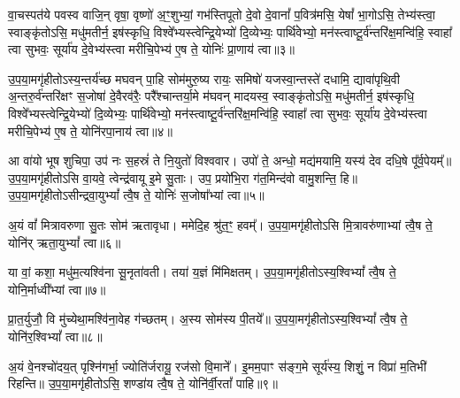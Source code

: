 {\anuvakamend[{यु॒ष्माकꣴ॑ स्वर॒ यत्ते॒ नव॑ च॥१॥}]}

वा॒चस्पत॑ये पवस्व वाजि॒न् वृषा॒ वृष्णो॑ अ॒ꣳ॒शुभ्यां॒ गभ॑स्तिपूतो दे॒वो दे॒वानां᳚ प॒वित्र॑मसि॒ येषां᳚ भा॒गो\-ऽसि॒ तेभ्य॑स्त्वा॒ स्वाङ्कृ॑तो\-ऽसि॒ मधु॑मतीर्न॒ इष॑स्कृधि॒ विश्वे᳚भ्यस्त्वेन्द्रि॒येभ्यो॑ दि॒व्येभ्यः॒ पार्थि॑वेभ्यो॒ मन॑स्त्वाष्टू॒र्व॑न्तरि॑क्ष॒मन्वि॑हि॒ स्वाहा᳚ त्वा सुभवः॒ सूर्या॑य दे॒वेभ्य॑स्त्वा मरीचि॒पेभ्य॑ ए॒ष ते॒ योनिः॑ प्रा॒णाय॑ त्वा॥३॥

{\anuvakamend[{वा॒चः स॒प्तच॑त्वारिꣳशत्॥२॥}]}

उ॒प॒या॒मगृ॑हीतो\-ऽस्य॒न्तर्य॑च्छ मघवन् पा॒हि सोम॑मुरु॒ष्य रायः॒ समिषो॑ यजस्वा॒न्तस्ते॑ दधामि॒ द्यावा॑पृथि॒वी अ॒न्तरु॒र्व॑न्तरि॑क्षꣳ स॒जोषा॑ दे॒वैरव॑रैः॒ परै᳚श्चान्तर्या॒मे म॑घवन् मादयस्व॒ स्वाङ्कृ॑तो\-ऽसि॒ मधु॑मतीर्न॒ इष॑स्कृधि॒ विश्वे᳚भ्यस्त्वेन्द्रि॒येभ्यो॑ दि॒व्येभ्यः॒ पार्थि॑वेभ्यो॒ मन॑स्त्वाष्टू॒र्व॑न्तरि॑क्ष॒मन्वि॑हि॒ स्वाहा᳚ त्वा सुभवः॒ सूर्या॑य दे॒वेभ्य॑स्त्वा मरीचि॒पेभ्य॑ ए॒ष ते॒ योनि॑रपा॒नाय॑ त्वा॥४॥

{\anuvakamend[{दे॒वेभ्यः॑ स॒प्त च॑॥३॥}]}

आ वा॑यो भूष शुचिपा॒ उप॑ नः स॒हस्रं॑ ते नि॒युतो॑ विश्ववार। उपो॑ ते॒ अन्धो॒ मद्य॑मयामि॒ यस्य॑ देव दधि॒षे पू᳚र्व॒पेयम्᳚॥ उ॒प॒या॒मगृ॑हीतो\-ऽसि वा॒यवे॒ त्वेन्द्र॑वायू इ॒मे सु॒ताः। उप॒ प्रयो॑भि॒रा ग॑त॒मिन्द॑वो वामु॒शन्ति॒ हि॥ उ॒प॒या॒मगृ॑हीतो\-ऽसीन्द्रवा॒यु\-भ्यां᳚ त्वै॒ष ते॒ योनिः॑ स॒जोषा᳚भ्यां त्वा॥५॥

{\anuvakamend[{आ वा॑यो॒ त्रिच॑त्वारिꣳशत्॥४॥}]}

अ॒यं वां᳚ मित्रावरुणा सु॒तः सोम॑ ऋतावृधा। ममेदि॒ह श्रु॑त॒ꣳ॒ हवम्᳚। उ॒प॒या॒मगृ॑हीतो\-ऽसि मि॒त्रावरु॑णाभ्यां त्वै॒ष ते॒ योनि॑र् ऋता॒यु\-भ्यां᳚ त्वा॥६॥

{\anuvakamend[{अ॒यं वां᳚ विꣳश॒तिः॥५॥}]}

या वां॒ कशा॒ मधु॑म॒त्यश्वि॑ना सू॒नृता॑वती। तया॑ य॒ज्ञं मि॑मिक्षतम्। उ॒प॒या॒मगृ॑हीतो\-ऽस्य॒श्वि\-भ्यां᳚ त्वै॒ष ते॒ योनि॒र्माध्वी᳚भ्यां त्वा॥७॥

{\anuvakamend[{या वा॑म॒ष्टाद॑श॥६॥}]}

प्रा॒त॒र्युजौ॒ वि मु॑च्येथा॒मश्वि॑ना॒वेह ग॑च्छतम्। अ॒स्य सोम॑स्य पी॒तये᳚॥ उ॒प॒या॒मगृ॑हीतो\-ऽस्य॒श्वि\-भ्यां᳚ त्वै॒ष ते॒ योनि॑र॒श्वि\-भ्यां᳚ त्वा॥८॥

{\anuvakamend[{प्रा॒त॒र्युजा॒वेका॒न्नविꣳ॑शतिः॥७॥}]}

अ॒यं वे॒नश्चो॑दय॒त् पृश्नि॑गर्भा॒ ज्योति॑र्जरायू॒ रज॑सो वि॒माने᳚। इ॒मम॒पाꣳ स॑ङ्ग॒मे सूर्य॑स्य॒ शिशुं॒ न विप्रा॑ म॒तिभी॑ रिहन्ति॥ उ॒प॒या॒मगृ॑हीतो\-ऽसि॒ शण्डा॑य त्वै॒ष ते॒ योनि॑र्वी॒रतां᳚ पाहि॥९॥

